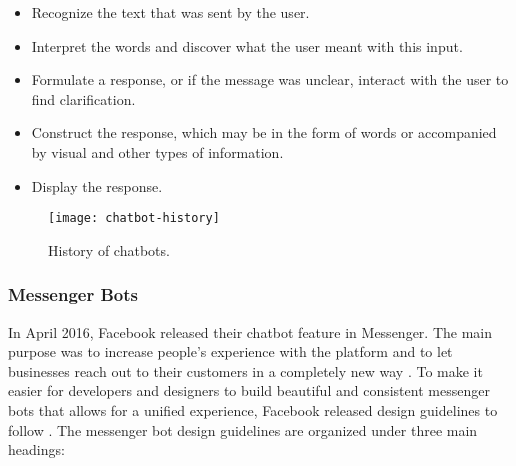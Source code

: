 \begin{itemize}
\item Recognize the text that was sent by the user.
\item Interpret the words and discover what the user meant with this input.
\item Formulate a response, or if the message was unclear, interact with the user to find clarification.
\item Construct the response, which may be in the form of words or accompanied by visual and other types of information.
\item Display the response.
\end{itemize}


\begin{figure}[htb]
	\centering
	\texttt{[image: chatbot-history]}
	\caption{History of chatbots.}
	\label{personal-info}
\end{figure}








\subsubsection{Messenger Bots}
In April 2016, Facebook released their chatbot feature in Messenger. The main purpose was to increase people's experience with the platform and to let businesses reach out to their customers in a completely new way \cite{messenger}. To make it easier for developers and designers to build beautiful and consistent messenger bots that allows for a unified experience, Facebook released design guidelines to follow \cite{messenger_guidelines}. The messenger bot design guidelines are organized under three main headings:

